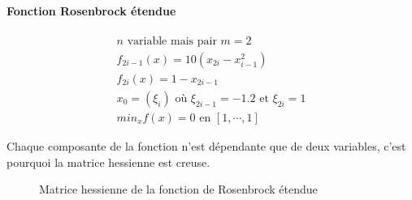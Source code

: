 \paragraph{Fonction Rosenbrock \'etendue}

\begin{align*}
n\text{ variable mais pair } m=2 \\
f_{2i-1}(x)=10(x_{2i}-x^2_{i-1})\\
f_{2i}(x)=1-x_{2i-1}\\
x_0= (\xi_i) \text{ o\`u } \xi_{2i-1}= -1.2  \text{ et } \xi_{2i}=1 \\
min_x f(x) = 0 \text{ en } [1,\cdots ,1]
\end{align*}

Chaque composante de la fonction n'est d\'ependante que de deux variables, c'est pourquoi la matrice hessienne est creuse.

\begin{figure}
\caption{Matrice hessienne de la fonction de Rosenbrock \'etendue}
\begin{center}
\end{center}
\label{fig:rosenbrock}
\end{figure}



